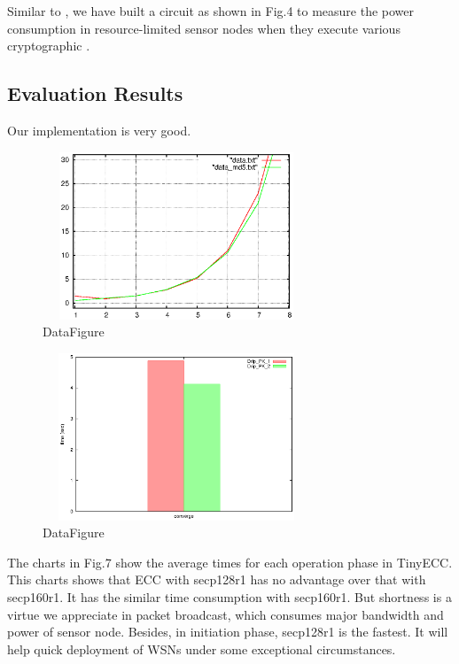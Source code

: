 \documentclass{sig-alternate-05-2015}
\begin{document}
Similar to , we have built a circuit as shown in Fig.4 to measure the power consumption in resource-limited sensor nodes when they execute various cryptographic .



\subsection{Evaluation Results}
Our implementation is very good.

\begin{figure}[ht]
\begin{center}
\includegraphics[width=8cm,height=5cm]{compare_color.eps}
\end{center}
\caption{DataFigure}\label{fig:SSDArchitecture}
\end{figure}

\begin{figure}[ht]
\begin{center}
\includegraphics[width=8cm,height=5cm]{converge.eps}
\end{center}
\caption{DataFigure}\label{fig:SSDArchitecture}
\end{figure}


The charts in Fig.7 show the average times for each operation phase in TinyECC. This charts shows that ECC with secp128r1 has no advantage over that with secp160r1. It has the similar time consumption with secp160r1. But shortness is a virtue we appreciate in packet broadcast, which consumes major bandwidth and power of sensor node. Besides, in initiation phase, secp128r1 is the fastest. It will help quick deployment of WSNs under some exceptional circumstances.
\end{document}
